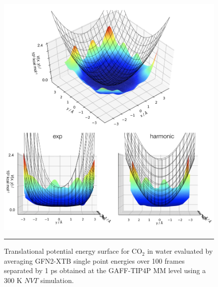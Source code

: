 \documentclass[../main.tex]{subfiles}
\begin{document}
\begin{figure}[h!]
	\vspace{0.2cm}
	\centering
	\includegraphics[width=\textwidth]{4/figs/figX4/2d_co2_in_h2o_mm_xtb}
	\vspace{0.2cm}
	\hrule
	\caption{Translational potential energy surface for CO$_2$ in water evaluated by averaging GFN2-XTB single point energies over 100 frames separated by 1 ps obtained at the GAFF-TIP4P MM level using a 300 K $NVT$ simulation.} 
	\label{fig::2d_co2_in_h2o_mm_xtb}
\end{figure}

\end{document}
